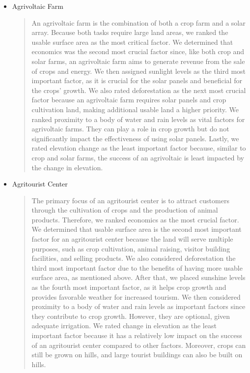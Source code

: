 \documentclass{mcmthesis}
\begin{document}
\begin{itemize}
    \item Agrivoltaic Farm
    \begin{quote}
        An agrivoltaic farm is the combination of both a crop farm and a solar array. Because both tasks require large land areas, we ranked the usable surface area as the most critical factor. We determined that economics was the second most crucial factor since, like both crop and solar farms, an agrivoltaic farm aims to generate revenue from the sale of crops and energy. We then assigned sunlight levels as the third most important factor, as it is crucial for the solar panels and beneficial for the crops' growth. We also rated deforestation as the next most crucial factor because an agrivoltaic farm requires solar panels and crop cultivation land, making additional usable land a higher priority. We ranked proximity to a body of water and rain levels as vital factors for agrivoltaic farms. They can play a role in crop growth but do not significantly impact the effectiveness of using solar panels. Lastly, we rated elevation change as the least important factor because, similar to crop and solar farms, the success of an agrivoltaic is least impacted by the change in elevation.
    \end{quote}

    \item Agritourist Center
    \begin{quote}
        The primary focus of an agritourist center is to attract customers through the cultivation of crops and the production of animal products. Therefore, we ranked economics as the most crucial factor. We determined that usable surface area is the second most important factor for an agritourist center because the land will serve multiple purposes, such as crop cultivation, animal raising, visitor building facilities, and selling products. We also considered deforestation the third most important factor due to the benefits of having more usable surface area, as mentioned above. After that, we placed sunshine levels as the fourth most important factor, as it helps crop growth and provides favorable weather for increased tourism. We then considered proximity to a body of water and rain levels as important factors since they contribute to crop growth. However, they are optional, given adequate irrigation. We rated change in elevation as the least important factor because it has a relatively low impact on the success of an agritourist center compared to other factors. Moreover, crops can still be grown on hills, and large tourist buildings can also be built on hills.
    \end{quote}
\end{itemize}
\end{document}
